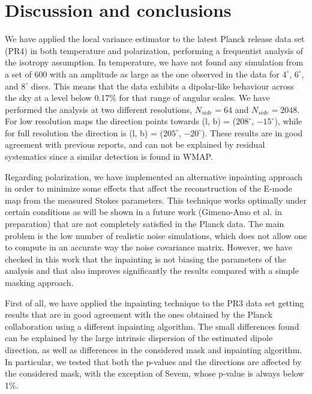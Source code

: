 \section{Discussion and conclusions} \label{Con}

We have applied the local variance estimator to the latest Planck release data set (PR4) in both temperature and polarization, performing a frequentist analysis of the isotropy assumption. In temperature, we have not found any simulation from a set of 600 with an amplitude as large as the one observed in the data for $4^{\circ}$, $6^{\circ}$, and $8^{\circ}$ discs. This means that the data exhibits a dipolar-like behaviour across the sky at a level below 0.17\% for that range of angular scales. We have performed the analysis at two different resolutions, $N_{side} = 64$ and $N_{side} = 2048$. For low resolution maps the direction points towards (l, b) = ($208^{\circ}$, $-15^{\circ}$), while for full resolution the direction is (l, b) = ($205^{\circ}$, $-20^{\circ}$). These results are in good agreement with previous reports, and can not be explained by residual systematics since a similar detection is found in WMAP.

Regarding polarization, we have implemented an alternative inpainting approach in order to minimize some effects that affect the reconstruction of the E-mode map from the measured Stokes parameters. This technique works optimally under certain conditions as will be shown in a future work (Gimeno-Amo et al. in preparation) that are not completely satisfied in the Planck data. The main problem is the low number of realistic noise simulations, which does not allow one to compute in an accurate way the noise covariance matrix. However, we have checked in this work that the inpainting is not biasing the parameters of the analysis and that also improves significantly the results compared with a simple masking approach.

First of all, we have applied the inpainting technique to the PR3 data set getting results that are in good agreement with the ones obtained by the Planck collaboration using a different inpainting algorithm. 
The small differences found can be explained by the large intrinsic dispersion of the estimated dipole direction, as well as differences in the considered mask and inpainting algorithm.
In particular, we tested that both the p-values and the directions are affected by the considered mask, with the exception of Sevem,
whose p-value is always below 1\%.

